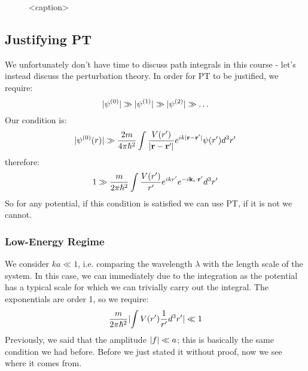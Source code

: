 \begin{figure}[htbp]
    \centering
    
    \caption{<caption>}
    \label{<label>}
\end{figure}

\subsection{Justifying PT}
We unfortunately don't have time to discuss path integrals in this course - let's instead discuss the perturbation theory. In order for PT to be justified, we require:
\begin{equation}
    \lvert \psi^{(0)} \rvert \gg \lvert \psi^{(1)} \rvert \gg \lvert \psi^{(2)} \rvert \gg \ldots
\end{equation}
Our condition is:
\begin{equation}
    \lvert \psi^{(0)}(r) \rvert \gg \frac{2m}{4\pi \hbar^2}\int \frac{V(r')}{\lvert \mathbf{r} - \mathbf{r}' \rvert}e^{ik\lvert \mathbf{r} - \mathbf{r}' \rvert}\psi(r')d^3r'
\end{equation}
therefore:
\begin{equation}
    1 \gg \frac{m}{2\pi \hbar^2}\int \frac{V(r')}{r'}e^{ikr'}e^{-i\mathbf{k}_i \cdot \mathbf{r}'}d^3r'
\end{equation}
So for any potential, if this condition is satisfied we can use PT, if it is not we cannot.

\subsubsection{Low-Energy Regime}
We consider $ka \ll 1$, i.e. comparing the wavelength $\lambda$ with the length scale of the system. In this case, we can immediately due to the integration as the potential has a typical scale for which we can trivially carry out the integral. The exponentials are order 1, so we require:
\begin{equation}
    \frac{m}{2\pi \hbar^2} \lvert \int V(r') \frac{1}{r'}d^3r' \rvert \ll 1
\end{equation}
Previously, we said that the amplitude $\lvert f \rvert \ll a$; this is basically the same condition we had before. Before we just stated it without proof, now we see where it comes from.

